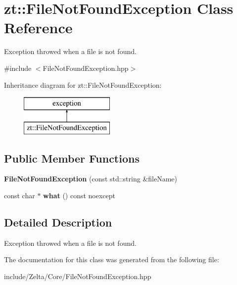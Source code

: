 \hypertarget{classzt_1_1_file_not_found_exception}{}\section{zt\+:\+:File\+Not\+Found\+Exception Class Reference}
\label{classzt_1_1_file_not_found_exception}


Exception throwed when a file is not found.  




{\ttfamily \#include $<$File\+Not\+Found\+Exception.\+hpp$>$}

Inheritance diagram for zt\+:\+:File\+Not\+Found\+Exception\+:\begin{figure}[H]
\begin{center}
\leavevmode
\includegraphics[height=2.000000cm]{classzt_1_1_file_not_found_exception}
\end{center}
\end{figure}
\subsection*{Public Member Functions}
\begin{DoxyCompactItemize}
\item 
\mbox{\label{classzt_1_1_file_not_found_exception_a091a0f51ae4994992c0b14dbf2c418e7}} 
{\bfseries File\+Not\+Found\+Exception} (const std\+::string \&file\+Name)
\item 
\mbox{\label{classzt_1_1_file_not_found_exception_a920c22b2905a4a871d8373543167cadb}} 
const char $\ast$ {\bfseries what} () const noexcept
\end{DoxyCompactItemize}


\subsection{Detailed Description}
Exception throwed when a file is not found. 

The documentation for this class was generated from the following file\+:\begin{DoxyCompactItemize}
\item 
include/\+Zelta/\+Core/File\+Not\+Found\+Exception.\+hpp\end{DoxyCompactItemize}
